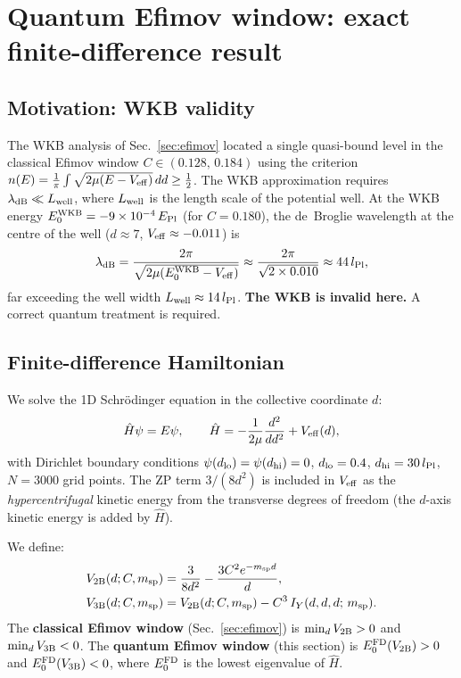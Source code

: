 \section{Quantum Efimov window: exact finite-difference result}
\label{sec:quantum_window}

\subsection{Motivation: WKB validity}

The WKB analysis of Sec.~\ref{sec:efimov} located a single quasi-bound
level in the classical Efimov window $C\in(0.128,\,0.184)$ using the
criterion $n(E)=\frac{1}{\pi}\int\sqrt{2\mu(E-V_{\rm eff})}\,dd\geq\tfrac{1}{2}$.
The WKB approximation requires $\lambda_{\rm dB}\ll L_{\rm well}$, where
$L_{\rm well}$ is the length scale of the potential well.  At the WKB
energy $E_0^{\rm WKB}=-9\times10^{-4}\,E_{\rm Pl}$ (for $C=0.180$), the
de~Broglie wavelength at the centre of the well ($d\approx7$,
$V_{\rm eff}\approx-0.011$) is
\begin{equation}
  \lambda_{\rm dB} = \frac{2\pi}{\sqrt{2\mu(E_0^{\rm WKB}-V_{\rm eff})}}
  \approx \frac{2\pi}{\sqrt{2\times0.010}} \approx 44\,l_{\rm Pl},
\end{equation}
far exceeding the well width $L_{\rm well}\approx14\,l_{\rm Pl}$.
\textbf{The WKB is invalid here.}  A correct quantum treatment is
required.

\subsection{Finite-difference Hamiltonian}

We solve the 1D Schr\"odinger equation in the collective coordinate $d$:
\begin{equation}
  \hat{H}\psi = E\psi,\qquad
  \hat{H} = -\frac{1}{2\mu}\frac{d^2}{dd^2} + V_{\rm eff}(d),
\end{equation}
with Dirichlet boundary conditions $\psi(d_{\rm lo})=\psi(d_{\rm hi})=0$,
$d_{\rm lo}=0.4$, $d_{\rm hi}=30\,l_{\rm Pl}$, $N=3000$ grid points.
The ZP term $3/(8d^2)$ is included in $V_{\rm eff}$ as the
\emph{hypercentrifugal} kinetic energy from the transverse degrees of
freedom (the $d$-axis kinetic energy is added by $\hat{H}$).

We define:
\begin{align}
  V_{\rm 2B}(d;C,m_{\rm sp}) &=
    \frac{3}{8d^2} - \frac{3C^2 e^{-m_{\rm sp}d}}{d}, \\
  V_{\rm 3B}(d;C,m_{\rm sp}) &=
    V_{\rm 2B}(d;C,m_{\rm sp}) - C^3\,I_Y(d,d,d;\,m_{\rm sp}).
\end{align}
The \textbf{classical Efimov window} (Sec.~\ref{sec:efimov}) is
$\min_d V_{\rm 2B}>0$ and $\min_d V_{\rm 3B}<0$.  The
\textbf{quantum Efimov window} (this section) is
$E_0^{\rm FD}(V_{\rm 2B})>0$ and $E_0^{\rm FD}(V_{\rm 3B})<0$,
where $E_0^{\rm FD}$ is the lowest eigenvalue of $\hat{H}$.

